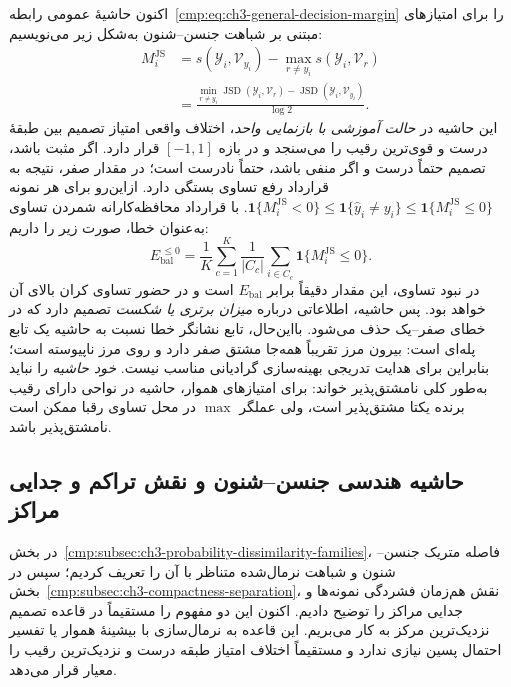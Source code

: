 اکنون حاشیهٔ عمومی
رابطه~\eqref{cmp:eq:ch3-general-decision-margin}
را برای امتیازهای مبتنی بر شباهت جنسن--شنون
به‌شکل زیر می‌نویسیم:
\begin{equation}\label{cmp:eq:ch3-js-margin-distance-difference}
\boxed{
\begin{aligned}
M_i^{\mathrm{JS}}
&=s(\mathscr Y_i,\mathcal V_{y_i})
-\max_{r\ne y_i}s(\mathscr Y_i,\mathcal V_r)\\
&=\frac{\displaystyle
\min_{r\ne y_i}\operatorname{JSD}(\mathscr Y_i,\mathcal V_r)
-\operatorname{JSD}(\mathscr Y_i,\mathcal V_{y_i})}
{\log 2}.
\end{aligned}}
\end{equation}
این حاشیه در \emph{حالت آموزشی با بازنمایی واحد}،
اختلاف واقعی امتیاز تصمیم
بین طبقهٔ درست و قوی‌ترین رقیب را می‌سنجد و
در بازه $[-1,1]$ قرار دارد. اگر مثبت باشد، تصمیم
حتماً درست و اگر منفی باشد، حتماً نادرست است؛
در مقدار صفر، نتیجه به قرارداد رفع تساوی بستگی دارد.
ازاین‌رو برای هر نمونه
$\mathbf1\{M_i^{\mathrm{JS}}<0\}
\le\mathbf1\{\widehat y_i\ne y_i\}
\le\mathbf1\{M_i^{\mathrm{JS}}\le0\}$.
با قرارداد محافظه‌کارانه شمردن تساوی به‌عنوان خطا،
صورت زیر را داریم:
\begin{equation}\label{cmp:eq:ch3-js-hard-margin-error}
E_{\mathrm{bal}}^{\,\le0}
=\frac1K\sum_{c=1}^{K}\frac1{|C_c|}
\sum_{i\in C_c}
\mathbf1\{M_i^{\mathrm{JS}}\le0\}.
\end{equation}
در نبود تساوی، این مقدار دقیقاً برابر
$E_{\mathrm{bal}}$ است و در حضور تساوی
کران بالای آن خواهد بود.
پس حاشیه، اطلاعاتی درباره \emph{میزان برتری یا شکست}
تصمیم دارد که در خطای صفر--یک حذف می‌شود.
بااین‌حال، تابع نشانگر خطا نسبت به حاشیه یک تابع
پله‌ای است: بیرون مرز تقریباً همه‌جا مشتق صفر
دارد و روی مرز ناپیوسته است؛ بنابراین
برای هدایت تدریجی بهینه‌سازی گرادیانی مناسب نیست.
\emph{خود حاشیه} را نباید به‌طور کلی نامشتق‌پذیر
خواند: برای امتیازهای هموار، حاشیه در نواحی
دارای رقیب برنده یکتا مشتق‌پذیر است،
ولی عملگر $\max$ در محل تساوی رقبا ممکن است
نامشتق‌پذیر باشد.



\subsection{حاشیه هندسی جنسن--شنون و نقش تراکم و جدایی مراکز}
\label{cmp:subsec:ch3-js-metric-classification}
در بخش~\ref{cmp:subsec:ch3-probability-dissimilarity-families}، فاصله متریک جنسن--شنون و شباهت نرمال‌شده متناظر با آن را تعریف کردیم؛ سپس در بخش~\ref{cmp:subsec:ch3-compactness-separation}، نقش هم‌زمان فشردگی نمونه‌ها و جدایی مراکز را توضیح دادیم. اکنون این دو مفهوم را مستقیماً در قاعده تصمیم نزدیک‌ترین مرکز به کار می‌بریم. این قاعده به نرمال‌سازی با بیشینهٔ هموار یا تفسیر احتمال پسین نیازی ندارد و مستقیماً اختلاف امتیاز طبقه درست و نزدیک‌ترین رقیب را معیار قرار می‌دهد.

